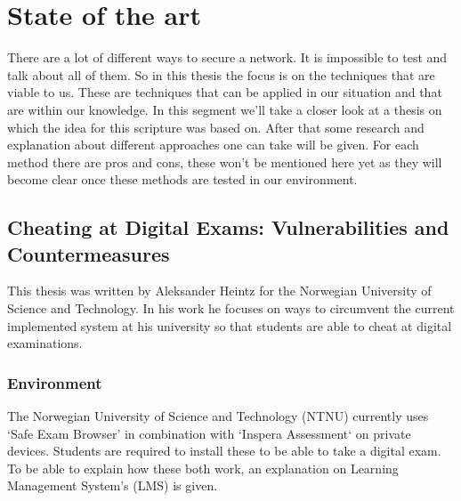 \chapter{State of the art}
\label{ch:stand-van-zaken}



There are a lot of different ways to secure a network. It is impossible to test and talk about all of them. So in this thesis the focus is on the techniques that are viable to us. These are techniques that can be applied in our situation and that are within our knowledge. In this segment we'll take a closer look at a thesis on which the idea for this scripture was based on. After that some research and explanation about different approaches one can take will be given. For each method there are pros and cons, these won't be mentioned here yet as they will become clear once these methods are tested in our environment.
\section{Cheating at Digital Exams: Vulnerabilities and Countermeasures}
This thesis was written by Aleksander Heintz for the Norwegian University of Science and Technology\textcite{thesis}. In his work he focuses on ways to circumvent the current implemented system at his university so that students are able to cheat at digital examinations.
\subsection{Environment}
The Norwegian University of Science and Technology (NTNU) currently uses `Safe Exam Browser' in combination with `Inspera Assessment` on private devices. Students are required to install these to be able to take a digital exam.
To be able to explain how these both work, an explanation on Learning Management System's (LMS) is given.
